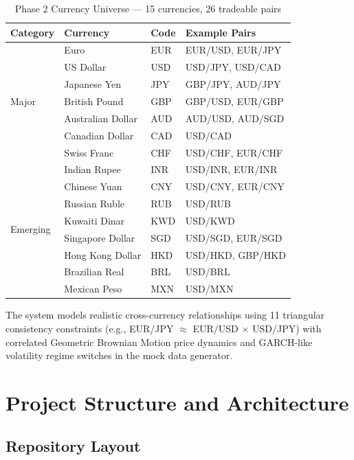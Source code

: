 \documentclass[letterpaper,11pt]{report}
\begin{document}
\begin{table}[h]
\centering
\caption{Phase 2 Currency Universe — 15 currencies, 26 tradeable pairs}
\begin{tabular}{llll}
\toprule
\textbf{Category} & \textbf{Currency} & \textbf{Code} & \textbf{Example Pairs} \\
\midrule
\multirow{7}{*}{Major} & Euro & EUR & EUR/USD, EUR/JPY \\
 & US Dollar & USD & USD/JPY, USD/CAD \\
 & Japanese Yen & JPY & GBP/JPY, AUD/JPY \\
 & British Pound & GBP & GBP/USD, EUR/GBP \\
 & Australian Dollar & AUD & AUD/USD, AUD/SGD \\
 & Canadian Dollar & CAD & USD/CAD \\
 & Swiss Franc & CHF & USD/CHF, EUR/CHF \\
\midrule
\multirow{8}{*}{Emerging} & Indian Rupee & INR & USD/INR, EUR/INR \\
 & Chinese Yuan & CNY & USD/CNY, EUR/CNY \\
 & Russian Ruble & RUB & USD/RUB \\
 & Kuwaiti Dinar & KWD & USD/KWD \\
 & Singapore Dollar & SGD & USD/SGD, EUR/SGD \\
 & Hong Kong Dollar & HKD & USD/HKD, GBP/HKD \\
 & Brazilian Real & BRL & USD/BRL \\
 & Mexican Peso & MXN & USD/MXN \\
\bottomrule
\end{tabular}
\end{table}

The system models realistic cross-currency relationships using 11 triangular consistency constraints (e.g., EUR/JPY $\approx$ EUR/USD $\times$ USD/JPY) with correlated Geometric Brownian Motion price dynamics and GARCH-like volatility regime switches in the mock data generator.


\chapter{Project Structure and Architecture}

\section{Repository Layout}
\end{document}
